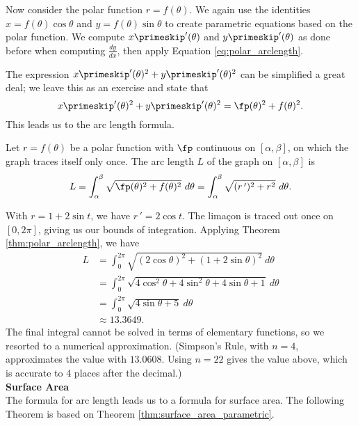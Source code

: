 Now consider the polar function $r=f(\theta)$. We again use the identities $x=f(\theta)\cos\theta$ and $y=f(\theta)\sin\theta$ to create parametric equations based on the polar function. We compute $x\primeskip'(\theta)$ and $y\primeskip'(\theta)$ as done before when computing $\frac{dy}{dx}$, then apply Equation \eqref{eq:polar_arclength}.

The expression $x\primeskip'(\theta)^2+y\primeskip'(\theta)^2$ can be simplified a great deal; we leave this as an exercise and state that $$x\primeskip'(\theta)^2+y\primeskip'(\theta)^2 = \fp(\theta)^2+f(\theta)^2.$$ This leads us to the  arc length formula.

{Let  $r=f(\theta)$ be a polar function with $\fp$ continuous on $[\alpha,\beta]$, on which the graph traces itself only once. The arc length $L$ of the graph on $[\alpha,\beta]$ is
$$L = \int_\alpha^\beta \sqrt{\fp(\theta)^2+f(\theta)^2}\ d\theta = \int_\alpha^\beta\sqrt{(r\,')^2+ r^2}\ d\theta.$$
}

{With $r=1+2\sin t$, we have $r\,' = 2\cos t$. The lima\c con is traced out once on $[0,2\pi]$, giving us our bounds of integration. Applying Theorem \ref{thm:polar_arclength}, we have
\begin{align*}
L 	&= \int_0^{2\pi} \sqrt{(2\cos\theta)^2+(1+2\sin\theta)^2}\ d\theta \\
		&=	\int_0^{2\pi} \sqrt{4\cos^2\theta+4\sin^2\theta +4\sin\theta+1}\ d\theta\\
		&=	\int_0^{2\pi} \sqrt{4\sin\theta+5}\ d\theta\\
		&\approx 13.3649.
\end{align*}
The final integral cannot be solved in terms of elementary functions, so we resorted to a numerical approximation. (Simpson's Rule, with $n=4$, approximates the value with $13.0608$. Using $n=22$ gives the value above, which is accurate to 4 places after the decimal.) 
}\\

\noindent\textbf{\large Surface Area}\\

The formula for arc length leads us to a formula for surface area. The following Theorem is based on Theorem \ref{thm:surface_area_parametric}.

